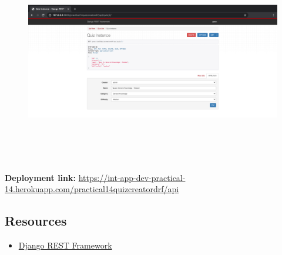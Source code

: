 \documentclass{article}
\begin{document}
\begin{figure}[H]
  \includegraphics[width=175mm, height=90mm]{./img/14-expected-drf-5.png}
\end{figure}

\textbf{Deployment link:} \href{https://int-app-dev-practical-14.herokuapp.com/practical14quizcreatordrf/api}{https://int-app-dev-practical-14.herokuapp.com/practical14quizcreatordrf/api}

\subsection*{Resources} 
\begin{itemize}
  \item \href{https://www.django-rest-framework.org/}{Django REST Framework}
\end{itemize}
\end{document}
